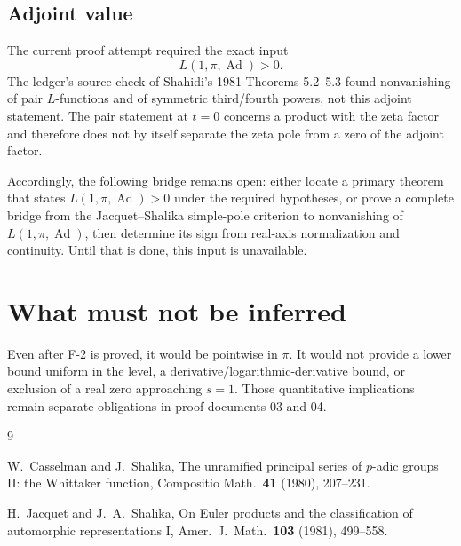 \documentclass[12pt]{article}
\DeclareMathOperator{\Ad}{Ad}
\begin{document}
\subsection{Adjoint value}

The current proof attempt required the exact input
\[
  L(1,\pi,\Ad)>0.
\]
The ledger's source check of Shahidi's 1981 Theorems 5.2--5.3 found
nonvanishing of pair $L$-functions and of symmetric third/fourth powers, not
this adjoint statement.  The pair statement at $t=0$ concerns a product with
the zeta factor and therefore does not by itself separate the zeta pole from a
zero of the adjoint factor.

Accordingly, the following bridge remains open: either locate a primary theorem
that states $L(1,\pi,\Ad)>0$ under the required hypotheses, or prove a complete
bridge from the Jacquet--Shalika simple-pole criterion to nonvanishing of
$L(1,\pi,\Ad)$, then determine its sign from real-axis normalization and
continuity.  Until that is done, this input is unavailable.

\section{What must not be inferred}

Even after F-2 is proved, it would be pointwise in $\pi$.  It would not provide
a lower bound uniform in the level, a derivative/logarithmic-derivative bound,
or exclusion of a real zero approaching $s=1$.  Those quantitative implications
remain separate obligations in proof documents 03 and 04.

\begin{thebibliography}{9}

 W.~Casselman and J.~Shalika, The unramified principal series of
  $p$-adic groups II: the Whittaker function, Compositio Math.\ \textbf{41}
  (1980), 207--231.

 H.~Jacquet and J.~A.~Shalika, On Euler products and the
  classification of automorphic representations I, Amer.\ J.\ Math.\ \textbf{103}
  (1981), 499--558.

\end{thebibliography}
\end{document}
